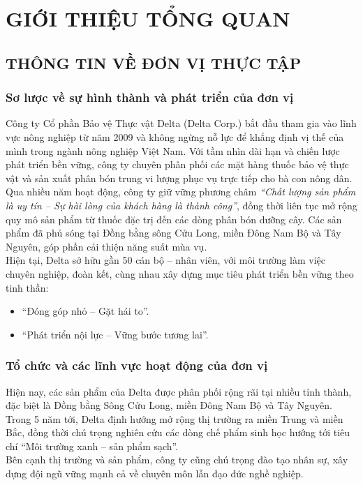 \chapter{GIỚI THIỆU TỔNG QUAN}
\section{THÔNG TIN VỀ ĐƠN VỊ THỰC TẬP}
\subsection{ Sơ lược về sự hình thành và phát triển của đơn vị}
Công ty Cổ phần Bảo vệ Thực vật Delta (Delta Corp.) bắt đầu tham gia vào lĩnh vực nông nghiệp từ năm 2009 và không ngừng nỗ lực để khẳng định vị thế của mình trong ngành nông nghiệp Việt Nam. Với tầm nhìn dài hạn và chiến lược phát triển bền vững, công ty chuyên phân phối các mặt hàng thuốc bảo vệ thực vật và sản xuất phân bón trung vi lượng phục vụ trực tiếp cho bà con nông dân. \\
\indent Qua nhiều năm hoạt động, công ty giữ vững phương châm \textit{``Chất lượng sản phẩm là uy tín – Sự hài lòng của khách hàng là thành công''}, đồng thời liên tục mở rộng quy mô sản phẩm từ thuốc đặc trị đến các dòng phân bón dưỡng cây. Các sản phẩm đã phủ sóng tại Đồng bằng sông Cửu Long, miền Đông Nam Bộ và Tây Nguyên, góp phần cải thiện năng suất mùa vụ. \\
\indent Hiện tại, Delta sở hữu gần 50 cán bộ – nhân viên, với môi trường làm việc chuyên nghiệp, đoàn kết, cùng nhau xây dựng mục tiêu phát triển bền vững theo tinh thần:
\begin{itemize}
    \item ``Đóng góp nhỏ – Gặt hái to''.
    \item ``Phát triển nội lực – Vững bước tương lai''.
\end{itemize}

\subsection{ Tổ chức và các lĩnh vực hoạt động của đơn vị}
Hiện nay, các sản phẩm của Delta được phân phối rộng rãi tại nhiều tỉnh thành, đặc biệt là Đồng bằng Sông Cửu Long, miền Đông Nam Bộ và Tây Nguyên. Trong 5 năm tới, Delta định hướng mở rộng thị trường ra miền Trung và miền Bắc, đồng thời chú trọng nghiên cứu các dòng chế phẩm sinh học hướng tới tiêu chí ``Môi trường xanh – sản phẩm sạch''. \\
\indent Bên cạnh thị trường và sản phẩm, công ty cũng chú trọng đào tạo nhân sự, xây dựng đội ngũ vững mạnh cả về chuyên môn lẫn đạo đức nghề nghiệp.

